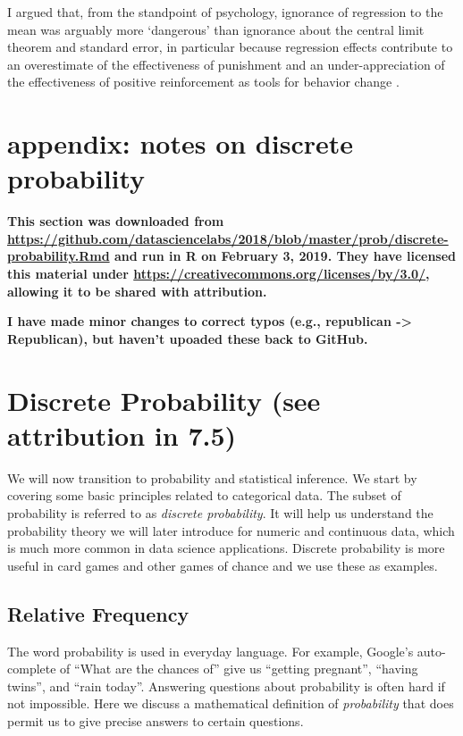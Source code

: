 \documentclass[
  openany]{book}
\begin{document}
I argued that, from the standpoint of psychology, ignorance of regression to the mean was arguably more `dangerous' than ignorance about the central limit theorem and standard error, in particular because regression effects contribute to an overestimate of the effectiveness of punishment and an under-appreciation of the effectiveness of positive reinforcement as tools for behavior change \citep{hastie2010rational}.

\hypertarget{appendix-notes-on-discrete-probability}{%
\section{appendix: notes on discrete probability}\label{appendix-notes-on-discrete-probability}}

\textbf{This section was downloaded from \url{https://github.com/datasciencelabs/2018/blob/master/prob/discrete-probability.Rmd} and run in R on February 3, 2019. They have licensed this material under \url{https://creativecommons.org/licenses/by/3.0/}, allowing it to be shared with attribution.}

\textbf{I have made minor changes to correct typos (e.g., republican -\textgreater{} Republican), but haven't upoaded these back to GitHub.}

\hypertarget{discrete-probability-see-attribution-in-7.5}{%
\section{Discrete Probability (see attribution in 7.5)}\label{discrete-probability-see-attribution-in-7.5}}

We will now transition to probability and statistical inference. We start by covering some basic principles related to categorical data. The subset of probability is referred to as \emph{discrete probability}. It will help us understand the probability theory we will later introduce for numeric and continuous data, which is much more common in data science applications. Discrete probability is more useful in card games and other games of chance and we use these as examples.

\hypertarget{relative-frequency}{%
\subsection{Relative Frequency}\label{relative-frequency}}

The word probability is used in everyday language. For example, Google's auto-complete of ``What are the chances of'' give us ``getting pregnant'', ``having twins'', and ``rain today''. Answering questions about probability is often hard if not impossible. Here we discuss a mathematical definition of \emph{probability} that does permit us to give precise answers to certain questions.
\end{document}
